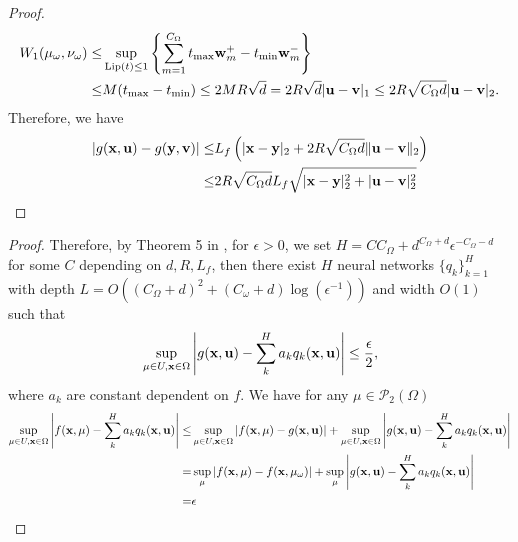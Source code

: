 \documentclass[aspectratio=169]{beamer}
\begin{document}
\begin{frame}
\begin{proof}
    \[
    \begin{aligned}
        W_1(\mu_\omega, \nu_\omega) \leq & \sup_{\mathrm{Lip}(t) \le 1} \left\{ \sum_{m=1}^{C_\Omega}  t_{\max} \mathbf{w}^+_m-t_{\min} \mathbf{w}^-_m\right\}\\
    \leq &  M (t_{\max}-t_{\min})\leq 2MR\sqrt{d}= 2R\sqrt{d}|\mathbf{u}-\mathbf{v}|_1\leq 2R\sqrt{{C_\Omega}d}|\mathbf{u}-\mathbf{v}|_2 .
    \end{aligned}
    \]
Therefore, we have 
\[
\begin{aligned}
|g(\mathbf{x},\mathbf{u})-g(\mathbf{y},\mathbf{v})| \leq &  L_f\left(|\mathbf{x}-\mathbf{y}|_2 + 2R\sqrt{{C_\Omega}d}\|\mathbf{u}-\mathbf{v}\|_2   \right)\\
\leq & 2R\sqrt{{C_\Omega}d}L_f \sqrt{|\mathbf{x}-\mathbf{y}|_2^2 +|\mathbf{u}-\mathbf{v}|^2_2 }
\end{aligned}
\]
    \end{proof}
\end{frame}
\begin{frame}
\begin{proof}
Therefore, by Theorem 5 in \cite{liu2024neural}, for $\epsilon>0$, we set $H=C{C_\Omega+d}^{C_\Omega+d}\epsilon^{-{C_\Omega-d}}$ for some $C$ depending on $d,R,L_f$, then there exist $H$ neural networks $\{q_k\}_{k=1}^H$ with depth $L = O( (C_\Omega+d)^2 + (C_\omega +d)\log(\epsilon^{-1}))$ and  width $O(1)$ such that 
\[
\sup_{\mu\in U ,\mathbf{x}\in \Omega }\left|g(\mathbf{x},\mathbf{u})-\sum_{k}^H a_k q_k(\mathbf{x},\mathbf{u})\right|\leq \frac{\epsilon}{2},
\]
where $a_k$ are constant dependent on $f$. We have for any $\mu\in \mathcal P_2(\Omega)$ 
\[
\begin{aligned}
    \sup_{\mu\in U ,\mathbf{x}\in \Omega }\left|f(\mathbf{x},\mu) - \sum_{k}^H a_k q_k(\mathbf{x},\mathbf{u})\right|\leq &\sup_{\mu\in U ,\mathbf{x}\in \Omega }\left|f(\mathbf{x},\mu) - g(\mathbf{x},\mathbf{u})\right|+ \sup_{\mu\in U ,\mathbf{x}\in \Omega }\left|g(\mathbf{x},\mathbf{u})-\sum_{k}^H a_k q_k(\mathbf{x},\mathbf{u})\right|\\
= & \sup_{\mu}\left|f(\mathbf{x},\mu) - f(\mathbf{x},\mu_\omega)\right|+ \sup_{\mu}\left|g(\mathbf{x},\mathbf{u})-\sum_{k}^H a_k q_k(\mathbf{x},\mathbf{u})\right|\\
= & \epsilon
\end{aligned}
\]
\end{proof}
    
\end{frame}
\begin{frame}[allowframebreaks]
\printbibliography
\end{frame}
\end{document}
